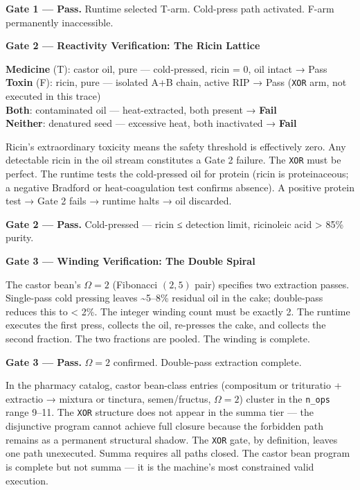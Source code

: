 \textbf{Gate 1 --- Pass.} Runtime selected T-arm. Cold-press path
activated. F-arm permanently inaccessible.

\textbf{Gate 2 --- Reactivity Verification: The Ricin Lattice}

\textbf{Medicine} (T): castor oil, pure --- cold-pressed, ricin = 0, oil
intact → Pass\\
\textbf{Toxin} (F): ricin, pure --- isolated A+B chain, active RIP →
Pass (\texttt{XOR} arm, not executed in this trace)\\
\textbf{Both}: contaminated oil --- heat-extracted, both present →
\textbf{Fail}\\
\textbf{Neither}: denatured seed --- excessive heat, both inactivated →
\textbf{Fail}

Ricin's extraordinary toxicity means the safety threshold is effectively
zero. Any detectable ricin in the oil stream constitutes a Gate 2
failure. The \texttt{XOR} must be perfect. The runtime tests the
cold-pressed oil for protein (ricin is proteinaceous; a negative
Bradford or heat-coagulation test confirms absence). A positive protein
test → Gate 2 fails → runtime halts → oil discarded.

\textbf{Gate 2 --- Pass.} Cold-pressed --- ricin ≤ detection limit,
ricinoleic acid \textgreater{} 85\% purity.

\textbf{Gate 3 --- Winding Verification: The Double Spiral}

The castor bean's \(\Omega = 2\) (Fibonacci \((2,5)\) pair) specifies
two extraction passes. Single-pass cold pressing leaves
\textasciitilde5--8\% residual oil in the cake; double-pass reduces this
to \textless{} 2\%. The integer winding count must be exactly 2. The
runtime executes the first press, collects the oil, re-presses the cake,
and collects the second fraction. The two fractions are pooled. The
winding is complete.

\textbf{Gate 3 --- Pass.} \(\Omega = 2\) confirmed. Double-pass
extraction complete.

In the pharmacy catalog, castor bean-class entries (compositum or
trituratio + extractio → mixtura or tinctura, semen/fructus,
\(\Omega = 2\)) cluster in the \texttt{n\_ops} range 9--11. The
\texttt{XOR} structure does not appear in the summa tier --- the
disjunctive program cannot achieve full closure because the forbidden
path remains as a permanent structural shadow. The \texttt{XOR} gate, by
definition, leaves one path unexecuted. Summa requires all paths closed.
The castor bean program is complete but not summa --- it is the
machine's most constrained valid execution.

